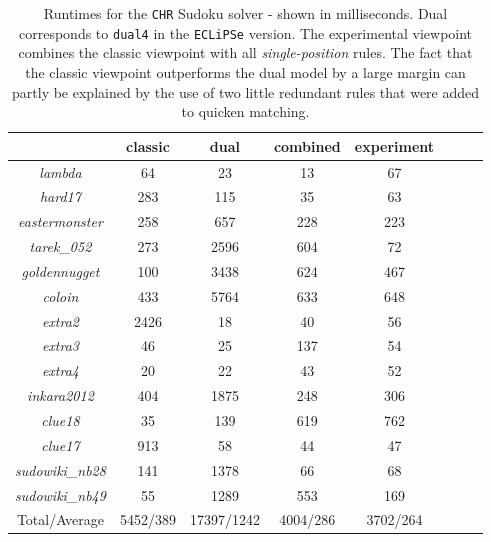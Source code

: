 \begin{table}[H]
\footnotesize
\centering
\bgroup
\def\arraystretch{1.3}
\begin{tabular}{cccc|ccc|c}
\multicolumn{1}{l}{} & classic & dual & combined & experiment \\ \hline
\textit{lambda} & 64 & 23 & 13 & 67  \\
\textit{hard17} & 283 & 115 & 35 & 63  \\
\textit{eastermonster} & 258 & 657 & 228 & 223  \\
\textit{tarek\_052} & 273 & 2596 & 604 & 72  \\
\textit{goldennugget} & 100 & 3438 & 624 & 467  \\
\textit{coloin} & 433 & 5764 & 633 & 648  \\
\textit{extra2} & 2426 & 18 & 40 & 56  \\
\textit{extra3} & 46 & 25 & 137 & 54  \\
\textit{extra4} & 20 & 22 & 43 & 52  \\
\textit{inkara2012} & 404 & 1875 & 248 & 306  \\
\textit{clue18} & 35 & 139 & 619 & 762  \\
\textit{clue17} & 913 & 58 & 44 & 47  \\
\textit{sudowiki\_nb28} & 141 & 1378 & 66 & 68  \\
\textit{sudowiki\_nb49} & 55 & 1289 & 553 & 169  \\\hline
Total/Average & 5452/389 & 17397/1242 & 4004/286 & 3702/264  \\
\end{tabular}
\egroup
\caption{Runtimes for the \texttt{CHR} Sudoku solver - shown in milliseconds. Dual corresponds to \texttt{dual4} in the \texttt{ECLiPSe} version. The experimental viewpoint combines the classic viewpoint with all \textit{single-position} rules. The fact that the classic viewpoint outperforms the dual model by a large margin can partly be explained by the use of two little redundant rules that were added to quicken matching.}
\label{tab:res4}
\end{table}